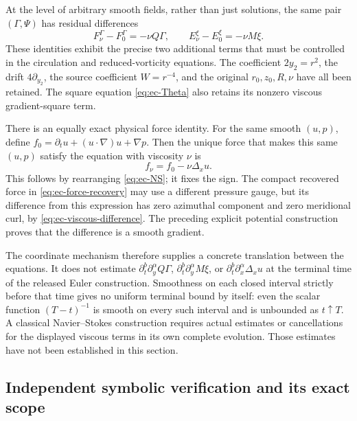 At the level of arbitrary smooth fields, rather than just solutions,
the same pair \((\Gamma,\Psi)\) has residual differences
\begin{equation}
 F_\nu^\Gamma-F_0^\Gamma=-\nu Q\Gamma,\qquad
 E_\nu^\xi-E_0^\xi=-\nu M\xi.
 \label{eq:ec-viscous-difference}
\end{equation}
These identities exhibit the precise two additional terms that must
be controlled in the circulation and reduced-vorticity equations.
The coefficient \(2y_2=r^2\), the drift \(4\partial_{y_2}\), the
source coefficient \(W=r^{-4}\), and the original \(r_0,z_0,R,\nu\)
have all been retained.  The square equation
\eqref{eq:ec-Theta} also retains its nonzero viscous gradient-square
term.

There is an equally exact physical force identity.  For the same
smooth \((u,p)\), define
\(f_0=\partial_tu+(u\cdot\nabla)u+\nabla p\).  Then the unique
force that makes this same \((u,p)\) satisfy the equation with viscosity
\(\nu\) is
\begin{equation}
 f_\nu=f_0-\nu\Delta_xu.
 \label{eq:ec-physical-force-difference}
\end{equation}
This follows by rearranging \eqref{eq:ec-NS}; it fixes the sign.
The compact recovered force in \eqref{eq:ec-force-recovery} may use a
different pressure gauge, but its difference from this expression has
zero azimuthal component and zero meridional curl, by
\eqref{eq:ec-viscous-difference}.  The preceding explicit potential
construction proves that the difference is a smooth gradient.

The coordinate mechanism therefore supplies a concrete translation
between the equations.  It does not estimate
\(\partial_t^b\partial_y^\alpha Q\Gamma\),
\(\partial_t^b\partial_y^\alpha M\xi\), or
\(\partial_t^b\partial_x^\alpha\Delta_xu\) at the terminal time of
the released Euler construction.  Smoothness on each closed interval
strictly before that time gives no uniform terminal bound by itself:
even the scalar function \((T-t)^{-1}\) is smooth on every such
interval and is unbounded as \(t\uparrow T\).  A classical
Navier--Stokes construction requires actual estimates or cancellations
for the displayed viscous terms in its own complete evolution.
Those estimates have not been established in this section.

\subsection{Independent symbolic verification and its exact scope}

